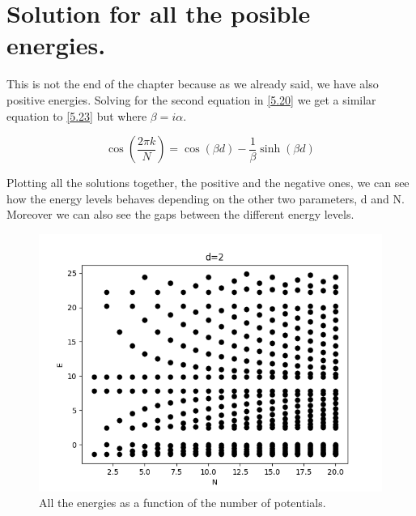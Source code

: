 \section{Solution for all the posible energies.}

This is not the end of the chapter because as we already said, we have also positive energies. Solving for the second equation in \ref{5.20} we get a similar equation to \ref{5.23} but where $\beta = i\alpha$.

\begin{equation}
  \label{5.26}
  \cos{\left(\frac{2\pi k}{N}\right)} = \cos{(\beta d)} - \frac{1}{\beta} \sinh{(\beta d)}
\end{equation}

Plotting all the solutions together, the positive and the negative ones, we can see how the energy levels behaves depending on the other two parameters, d and N. Moreover we can also see the gaps between the different energy levels.

\begin{figure}[H]
  \includegraphics{images5/Etotal_d=2_N.png}
  \centering
  \caption{All the energies as a function of the number of potentials.}
\end{figure}

